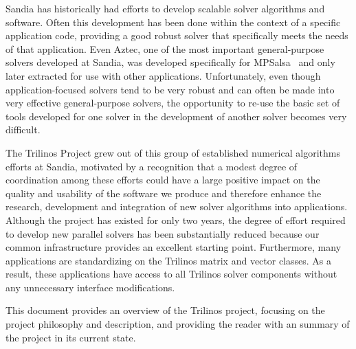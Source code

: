\documentclass[12pt,relax]{SANDreport}
\begin{document}
Sandia has historically had efforts to develop scalable solver algorithms and software.  Often this
development has been done within the context of a specific application code, providing a good robust solver
that specifically meets the needs of that application.  Even Aztec, one of the most important general-purpose
solvers developed at Sandia, was developed specifically for MPSalsa~\cite{MPSalsa-User-Guide,MPSalsa-Theory} 
and only later extracted 
for use with other applications.  Unfortunately, even though application-focused solvers 
tend to be very robust and can often be made into very effective general-purpose solvers, the opportunity
to re-use the basic set of tools developed for one solver in the development of another solver becomes very
difficult.

The Trilinos Project grew out of this group of established numerical algorithms
efforts at Sandia, motivated by  a recognition that a modest degree of 
coordination among these efforts could have a large positive impact on the quality and
usability of the software we produce and therefore enhance the
research, development and integration of new solver algorithms into
applications.  Although the project has existed for only two years, the degree of effort
required to develop new parallel solvers has been substantially reduced because our common
infrastructure provides an excellent starting point.  Furthermore, many applications are
standardizing on the Trilinos matrix and vector classes.  As a result, these applications
have access to all Trilinos solver components without any unnecessary interface modifications.

This document provides an overview of the Trilinos project,
focusing on the project philosophy and description, and
providing the reader with an summary of the project in its current state.  


    \clearpage
\end{document}
